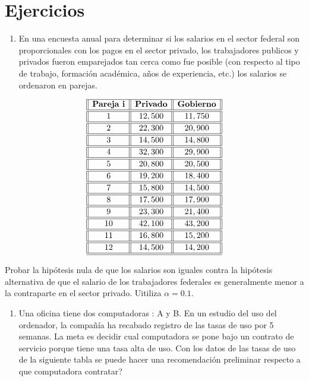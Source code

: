 \documentclass[a4paper,oneside,openany]{book}
\providecommand{\tightlist}{%
  \setlength{\itemsep}{0pt}\setlength{\parskip}{0pt}}
\begin{document}
\section{Ejercicios}\label{ejercicios-2}

\begin{enumerate}
\def\labelenumi{\arabic{enumi}.}
\tightlist
\item
  En una encuesta anual para determinar si los salarios en el sector
  federal son proporcionales con los pagos en el sector privado, los
  trabajadores publicos y privados fueron emparejados tan cerca como fue
  posible (con respecto al tipo de trabajo, formación académica, años de
  experiencia, etc.) los salarios se ordenaron en parejas.
\end{enumerate}

\[
\begin{equation*}
\begin{array}{||c| |c| |c||} 
\hline 
\textbf{Pareja i}  & \textbf{Privado} & \textbf{Gobierno} \\ 
\hline
\hline
1 &12,500& 11,750 \\
\hline
\hline
2& 22,300 &20,900 \\
\hline
\hline
3 &14,500 &14,800 \\
\hline
\hline
4 &32,300 &29,900 \\
\hline
\hline
5 &20,800 &20,500 \\
\hline
\hline
6 &19,200 &18,400 \\
\hline
\hline
7 &15,800 &14,500 \\
\hline
\hline
8 &17,500 &17,900 \\
\hline
\hline
9 &23,300 &21,400 \\
\hline
\hline
10 &42,100 &43,200 \\
\hline
\hline
11 &16,800 &15,200 \\
\hline
\hline
12& 14,500 &14,200 \\
\hline
\hline
\end{array}
\end{equation*}
\]

Probar la hipótesis nula de que los salarios son iguales contra la
hipótesis alternativa de que el salario de los trabajadores federales es
generalmente menor a la contraparte en el sector privado. Uitiliza
\(\alpha=0.1\).

\begin{enumerate}
\def\labelenumi{\arabic{enumi}.}
\setcounter{enumi}{1}
\tightlist
\item
  Una oficina tiene dos computadoras : A y B. En un estudio del uso del
  ordenador, la compañía ha recabado registro de las tasas de uso por 5
  semanas. La meta es decidir cual computadora se pone bajo un contrato
  de servicio porque tiene una tasa alta de uso. Con los datos de las
  tasas de uso de la siguiente tabla se puede hacer una recomendación
  preliminar respecto a que computadora contratar?
\end{enumerate}
\end{document}
